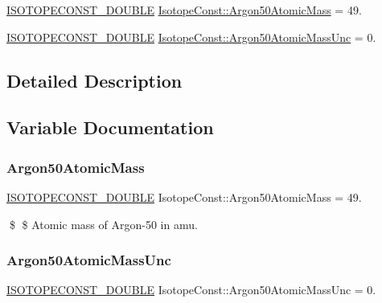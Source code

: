 \begin{DoxyCompactItemize}
\item 
\mbox{\hyperlink{group___isotope_const-_macros_ga8f45a7272ce02c0b4c65c44636ed719a}{I\+S\+O\+T\+O\+P\+E\+C\+O\+N\+S\+T\+\_\+\+D\+O\+U\+B\+LE}} \mbox{\hyperlink{group___isotope_const-_argon-_ar50_ga4b75b599cd0f000c301aca956eb228dc}{Isotope\+Const\+::\+Argon50\+Atomic\+Mass}} = 49.
\item 
\mbox{\hyperlink{group___isotope_const-_macros_ga8f45a7272ce02c0b4c65c44636ed719a}{I\+S\+O\+T\+O\+P\+E\+C\+O\+N\+S\+T\+\_\+\+D\+O\+U\+B\+LE}} \mbox{\hyperlink{group___isotope_const-_argon-_ar50_ga65488c9ee438f160fc4212b778222f27}{Isotope\+Const\+::\+Argon50\+Atomic\+Mass\+Unc}} = 0.
\end{DoxyCompactItemize}


\subsection{Detailed Description}


\subsection{Variable Documentation}
\mbox{\label{group___isotope_const-_argon-_ar50_ga4b75b599cd0f000c301aca956eb228dc}} 
\subsubsection{\texorpdfstring{Argon50\+Atomic\+Mass}{Argon50AtomicMass}}
{\footnotesize\ttfamily \mbox{\hyperlink{group___isotope_const-_macros_ga8f45a7272ce02c0b4c65c44636ed719a}{I\+S\+O\+T\+O\+P\+E\+C\+O\+N\+S\+T\+\_\+\+D\+O\+U\+B\+LE}} Isotope\+Const\+::\+Argon50\+Atomic\+Mass = 49.}

\$ \$ Atomic mass of Argon-\/50 in amu. \mbox{\label{group___isotope_const-_argon-_ar50_ga65488c9ee438f160fc4212b778222f27}} 
\subsubsection{\texorpdfstring{Argon50\+Atomic\+Mass\+Unc}{Argon50AtomicMassUnc}}
{\footnotesize\ttfamily \mbox{\hyperlink{group___isotope_const-_macros_ga8f45a7272ce02c0b4c65c44636ed719a}{I\+S\+O\+T\+O\+P\+E\+C\+O\+N\+S\+T\+\_\+\+D\+O\+U\+B\+LE}} Isotope\+Const\+::\+Argon50\+Atomic\+Mass\+Unc = 0.}

